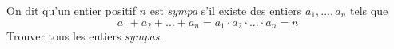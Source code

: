 On dit qu'un entier positif $n$ est \textit{sympa} s'il existe des entiers $a_1, \dots, a_n$ tels que
$$a_1+a_2+...+a_n=a_1\cdot a_2 \cdot ...\cdot a_n=n$$
Trouver tous les entiers \textit{sympas}.